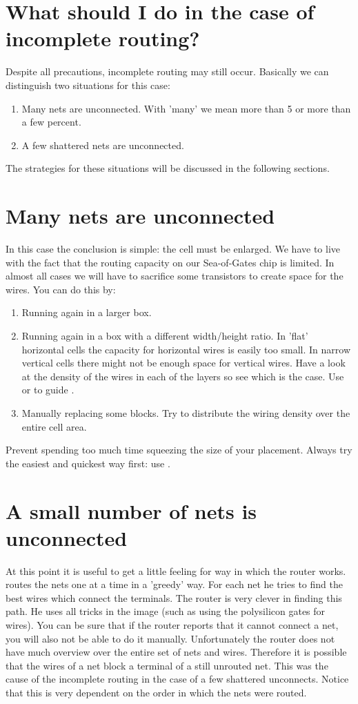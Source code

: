 \section{What should I do in the case of incomplete routing?}
Despite all precautions, incomplete routing may still occur.  
Basically we can
distinguish two situations for this case:
\begin{enumerate}
\item
Many nets are unconnected. With 'many' we mean more than 5
or more than a few percent.
\item
A few shattered nets are unconnected.
\end{enumerate}
The strategies for these situations will be discussed in
the following sections.

\section{Many nets are unconnected}
In this case the conclusion is simple: the cell must be enlarged.  We have to
live with the fact that the routing capacity on our Sea-of-Gates chip is
limited.  In almost all cases we will have to sacrifice some transistors to
create space for the wires. You can do this by:
\begin{enumerate}
\item
Running  again in a larger box. 
\item
Running  again in a box with a different width/height ratio.  In
'flat' horizontal cells the capacity for horizontal wires is easily too small.
In narrow vertical cells there might not be enough space for vertical wires.
Have a look at the density of the wires in each of the layers so see which is
the case. Use
 or  to guide
.
\item
Manually replacing some blocks. Try to distribute the
wiring density over the entire cell area.
\end{enumerate}
Prevent spending too much time squeezing the size of your
placement.  Always try the easiest and quickest way first: use .

\section{A small number of nets is unconnected}
At this point it is useful to get a little feeling for way in which the router
works.  routes the nets one at a time in a 'greedy' way.  For each
net he tries to find the best wires which connect the terminals.  The router
is very clever in finding this path.  He uses all tricks in the image (such as
using the polysilicon gates for wires).  You can be sure that if the router
reports that it cannot connect a net, you will also not be able to do it
manually.  Unfortunately the router does not have much overview over the
entire set of nets and wires. Therefore it is possible that the wires of a net
block a terminal of a still unrouted net. This was the cause of the incomplete
routing in the case of a few shattered unconnects.  Notice that this is very
dependent on the order in which the nets were routed. 

